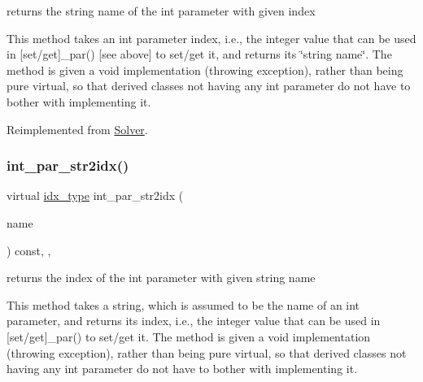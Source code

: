 returns the string name of the int parameter with given index 

This method takes an int parameter index, i.\+e., the integer value that can be used in \mbox{[}set/get\mbox{]}\+\_\+par() \mbox{[}see above\mbox{]} to set/get it, and returns its \char`\"{}string name\char`\"{}. The method is given a void implementation (throwing exception), rather than being pure virtual, so that derived classes not having any int parameter do not have to bother with implementing it. 

Reimplemented from \mbox{\hyperlink{class_s_m_spp__di__unipi__it_1_1_solver_a61e973f39747f63b8f56d97cc62e32ce}{Solver}}.

\mbox{\label{class_s_m_spp__di__unipi__it_1_1_c_d_a_solver_ae281b6699b0707a5cdc1e82b76d26c09}} 
\subsubsection{\texorpdfstring{int\+\_\+par\+\_\+str2idx()}{int\_par\_str2idx()}}
{\footnotesize\ttfamily virtual \mbox{\hyperlink{class_s_m_spp__di__unipi__it_1_1_thin_compute_interface_aa3d710629ad8c434286726ad810c3b47}{idx\+\_\+type}} int\+\_\+par\+\_\+str2idx (\begin{DoxyParamCaption}\item[{const std\+::string \&}]{name }\end{DoxyParamCaption}) const\hspace{0.3cm}{\ttfamily [inline]}, {\ttfamily [override]}, {\ttfamily [virtual]}}



returns the index of the int parameter with given string name 

This method takes a string, which is assumed to be the name of an int parameter, and returns its index, i.\+e., the integer value that can be used in \mbox{[}set/get\mbox{]}\+\_\+par() to set/get it. The method is given a void implementation (throwing exception), rather than being pure virtual, so that derived classes not having any int parameter do not have to bother with implementing it. 

